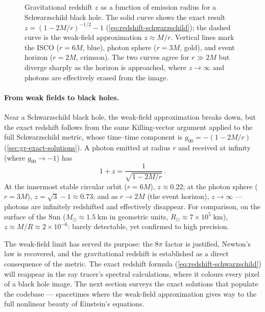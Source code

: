 \begin{figure}[htbp]
  \centering
  
  \caption[Gravitational redshift near a Schwarzschild black hole]{%
    Gravitational redshift $z$ as a function of emission radius
    for a Schwarzschild black hole.  The solid curve shows the exact result
    $z = (1-2M/r)^{-1/2} - 1$ (\cref{eq:redshift-schwarzschild}); the dashed
    curve is the weak-field approximation $z \approx M/r$.  Vertical lines mark
    the ISCO ($r = 6M$, blue), photon sphere ($r = 3M$, gold), and event
    horizon ($r = 2M$, crimson).  The two curves agree for $r \gg 2M$ but
    diverge sharply as the horizon is approached, where $z \to \infty$ and
    photons are effectively erased from the image.}
  \label{fig:grav-redshift-profile}
\end{figure}

\paragraph{From weak fields to black holes.}

Near a Schwarzschild black hole, the weak-field approximation breaks
down, but the exact redshift follows from the same Killing-vector
argument applied to the full Schwarzschild metric, whose time--time
component is $g_{00} = -(1 - 2M/r)$
(\cref{sec:gr-exact-solutions}).  A photon emitted at radius $r$ and
received at infinity (where $g_{00} \to -1$) has
%
\begin{equation}
  1 + z = \frac{1}{\sqrt{1 - 2M/r}} \,.
  \label{eq:redshift-schwarzschild}
\end{equation}
%
At the innermost stable circular orbit ($r = 6M$),
$z \approx 0.22$; at the photon sphere ($r = 3M$),
$z = \sqrt{3} - 1 \approx 0.73$; and as $r \to 2M$ (the event
horizon), $z \to \infty$ --- photons are infinitely redshifted and
effectively disappear.  For comparison, on the surface of the Sun
($M_\odot \approx 1.5\;\text{km}$ in geometric units,
$R_\odot \approx 7 \times 10^5\;\text{km}$),
$z \approx M/R \approx 2 \times 10^{-6}$: barely detectable, yet
confirmed to high precision.

The weak-field limit has served its purpose: the $8\pi$ factor is
justified, Newton's law is recovered, and the gravitational redshift
is established as a direct consequence of the metric.  The exact
redshift formula (\cref{eq:redshift-schwarzschild}) will reappear in
the ray tracer's spectral calculations, where it colours every pixel
of a black hole image.  The next section surveys the exact solutions
that populate the codebase --- spacetimes where the weak-field
approximation gives way to the full nonlinear beauty of Einstein's
equations.
